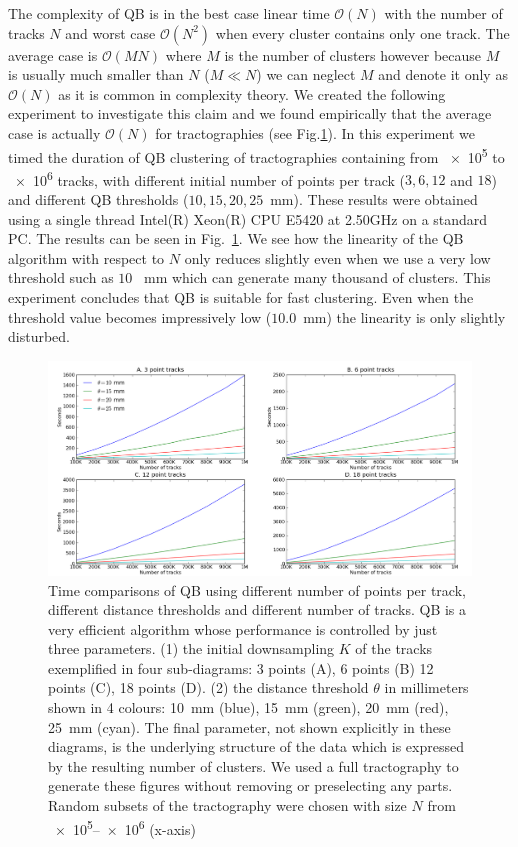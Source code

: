 \documentclass[journal]{IEEEtran}
\begin{document}
The complexity of QB is in the best case linear time $\mathcal{O}(N)$
with the number of tracks $N$ and worst case $\mathcal{O}(N^{2})$ when
every cluster contains only one track. The average case is
$\mathcal{O}(MN)$ where $M$ is the number of clusters however because
$M$ is usually much smaller than $N$ ($M\ll N$) we can neglect $M$ and
denote it only as $\mathcal{O}(N)$ as it is common in complexity
theory. We created the following experiment to investigate this claim
and we found empirically that the average case is actually
$\mathcal{O}(N)$ for tractographies (see Fig.\ref{Flo:Speed1}).  In this
experiment we timed the duration of QB clustering of tractographies
containing from \num{e5} to \num{e6} tracks, with different initial
number of points per track ($3,6,12$ and $18$) and different QB
thresholds ($10,15,20,25$~mm). These results were obtained using
a single thread Intel(R) Xeon(R) CPU E5420 at 2.50GHz on a standard
PC. The results can be seen in Fig.~\ref{Flo:Speed1}. We see how the
linearity of the QB algorithm with respect to $N$ only reduces slightly
even when we use a very low threshold such as $10$ ~mm which can
generate many thousand of clusters. This experiment concludes that QB is
suitable for fast clustering. Even when the threshold value becomes
impressively low ($10.0$~mm) the linearity is only slightly disturbed.

\begin{figure}
\noindent \begin{centering}
\includegraphics[scale=0.23]{Fig_3_2x2+leg-box}
\par\end{centering}
\caption{Time comparisons of QB using different number of points per
  track, different distance thresholds and different number of
  tracks. QB is a very efficient algorithm whose performance is
  controlled by just three parameters. (1) the initial downsampling $K$
  of the tracks exemplified in four sub-diagrams: 3 points (A), 6 points
  (B) 12 points (C), 18 points (D). (2) the distance threshold $\theta$
  in millimeters shown in 4 colours: 10~mm (blue), 15~mm (green), 20~mm
  (red), 25~mm (cyan). The final parameter, not shown explicitly in
  these diagrams, is the underlying structure of the data which is
  expressed by the resulting number of clusters.  We used a full
  tractography to generate these figures without removing or
  preselecting any parts. Random subsets of the tractography were
  chosen with size $N$ from \numrange{e5}{e6} (x-axis)\label{Flo:Speed1}}
\end{figure}
\end{document}
